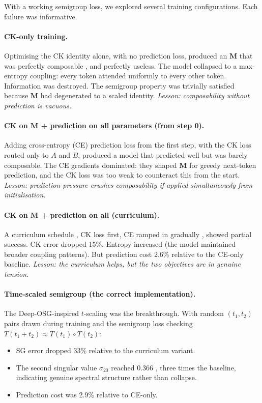 \documentclass[11pt, a4paper]{article}
\newcommand{\M}{\mathbf{M}}
\theoremstyle{plain}
\theoremstyle{remark}
\begin{document}
With a working semigroup loss, we explored several training configurations.
Each failure was informative.

\paragraph{CK-only training.}
Optimising the CK identity alone, with no prediction loss, produced an $\M$ that was perfectly composable ,  and perfectly useless.
The model collapsed to a max-entropy coupling: every token attended uniformly to every other token.
Information was destroyed.
The semigroup property was trivially satisfied because $\M$ had degenerated to a scaled identity.
\emph{Lesson: composability without prediction is vacuous.}

\paragraph{CK on $\M$ + prediction on all parameters (from step 0).}
Adding cross-entropy (CE) prediction loss from the first step, with the CK loss routed only to $A$ and $B$, produced a model that predicted well but was barely composable.
The CE gradients dominated: they shaped $\M$ for greedy next-token prediction, and the CK loss was too weak to counteract this from the start.
\emph{Lesson: prediction pressure crushes composability if applied simultaneously from initialisation.}

\paragraph{CK on $\M$ + prediction on all (curriculum).}
A curriculum schedule ,  CK loss first, CE ramped in gradually ,  showed partial success.
CK error dropped 15\%.
Entropy increased (the model maintained broader coupling patterns).
But prediction cost 2.6\% relative to the CE-only baseline.
\emph{Lesson: the curriculum helps, but the two objectives are in genuine tension.}

\paragraph{Time-scaled semigroup (the correct implementation).}
The Deep-OSG-inspired $t$-scaling was the breakthrough.
With random $(t_1, t_2)$ pairs drawn during training and the semigroup loss checking $T(t_1 + t_2) \approx T(t_1) \circ T(t_2)$:
\begin{itemize}[nosep]
  \item SG error dropped 33\% relative to the curriculum variant.
  \item The second singular value $\sigma_{20}$ reached 0.366 ,  three times the baseline, indicating genuine spectral structure rather than collapse.
  \item Prediction cost was 2.9\% relative to CE-only.
\end{itemize}
\end{document}
